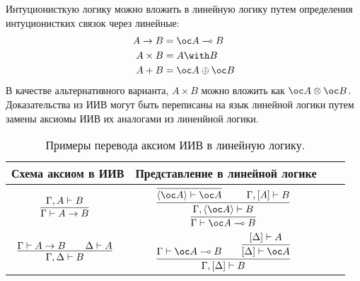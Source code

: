 Интуционисткую логику можно вложить в линейную логику путем определения интуционистких связок через линейные:
\begin{align*}
    A \to B &= \oc A \multimap B \\
    A \times B      &= A \with B \\
    A + B           &= \oc A \oplus \oc B
\end{align*}
В качестве альтернативного варианта, $A \times B$ можно вложить как $\oc A \otimes \oc B$.
Доказательства из ИИВ могут быть переписаны на язык линейной логики путем замены аксиомы ИИВ их аналогами из линенйной логики.
\begin{table}
\centering
\begin{tabular}{Sc Sc} \toprule
	Схема аксиом в ИИВ & Представление в линейной логике \\ \midrule
	$\infer[]{\Gamma \vdash A \to B}{\Gamma, A \vdash B}$ &
	$\infer[]{\Gamma \vdash \oc A \multimap B}{
		\infer[]{\Gamma, \pair{\oc A} \vdash B}{
			\infer[]{\pair{\oc A} \vdash \oc A}{} && \Gamma, [A] \vdash B
		}
	}$ \\ \midrule
	$\infer[]{\Gamma, \Delta \vdash B}{\Gamma \vdash A \to B && \Delta \vdash A}$ &
	$\infer[]{\Gamma, [\Delta] \vdash B}{
		\Gamma \vdash \oc A \multimap B && \infer[]{[\Delta] \vdash \oc A}{[\Delta] \vdash A}
	}$ \\ \bottomrule
\end{tabular}
\caption{Примеры перевода аксиом ИИВ в линейную логику.}
\label{intutionistic-axioms-to-linear-samples}
\end{table}

